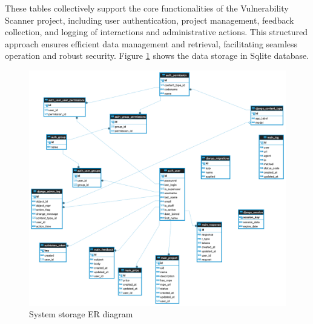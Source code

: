 These tables collectively support the core functionalities of the Vulnerability Scanner project, including user 
authentication, project management, feedback collection, and logging of interactions and administrative actions. 
This structured approach ensures efficient data management and retrieval, facilitating seamless operation and robust security.
Figure \ref{fig:dataStorage} shows the data storage in Sqlite database.

\begin{figure}[H]
    \centering
    \includegraphics[width=0.9\linewidth]{images/ERD.png}
    \caption{System storage ER diagram}
    \label{fig:dataStorage}
\end{figure}